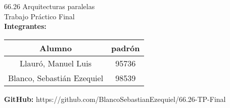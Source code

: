 \begin{titlepage}
    \vspace*{\fill}
    \begin{center}
        \Large 66.26 Arquitecturas paralelas \\
        \Huge Trabajo Práctico Final\\
        \bigskip\bigskip\bigskip
        \large\textbf{Integrantes:} \\
        \begin{center}
            \begin{tabular}{||c | c||}
                \hline
                Alumno & padrón \\ [0.5ex]
                \hline\hline
                Llauró, Manuel Luis & 95736 \\
                \hline
                Blanco, Sebastián Ezequiel & 98539 \\
                \hline
            \end{tabular}
        \end{center}
        \textbf{GitHub:} https://github.com/BlancoSebastianEzequiel/66.26-TP-Final\\

    \end{center}
    \vspace*{\fill}
\end{titlepage}
